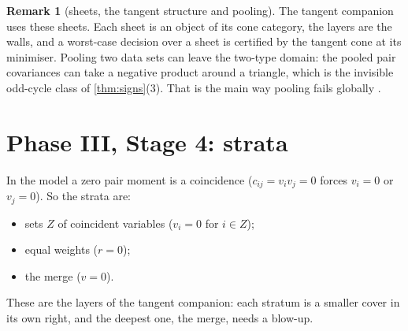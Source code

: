 \documentclass[11pt]{article}
\theoremstyle{definition}\newtheorem{definition}[theorem]{Definition}\newtheorem{remark}[theorem]{Remark}\newtheorem{example}[theorem]{Example}
\begin{document}
\begin{remark}[sheets, the tangent structure and pooling]
The tangent companion \cite{Tangent} uses these sheets. Each sheet is an object of its cone category, the layers are the walls, and a
worst-case decision over a sheet is certified by the tangent cone at its minimiser. Pooling two data sets can leave the two-type domain:
the pooled pair covariances can take a negative product around a triangle, which is the invisible odd-cycle class of \cref{thm:signs}(3).
That is the main way pooling fails globally \cite[Theorem ``pooling along a chord'']{Tangent}.
\end{remark}

\section{Phase III, Stage 4: strata}\label{sec:strata}
In the model a zero pair moment is a coincidence ($c_{ij}=v_iv_j=0$ forces $v_i=0$ or $v_j=0$). So the strata are:
\begin{itemize}
\item sets $Z$ of coincident variables ($v_i=0$ for $i\in Z$);
\item equal weights ($r=0$);
\item the merge ($v=0$).
\end{itemize}
These are the layers of the tangent companion: each stratum is a smaller cover in its own right, and the deepest one, the merge, needs a
blow-up.
\end{document}
